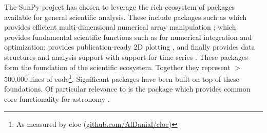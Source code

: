 The SunPy project has chosen  to leverage the rich ecosystem of packages available for general scientific analysis. These include packages such as
 which provides efficient multi-dimensional numerical array manipulation \citep{numpy} ;  which provides fundamental scientific functions such as for numerical integration and optimization\citep{scipy};  provides publication-ready 2D plotting \citep{matplotlib}, and finally  provides data structures and analysis support with support for time series \citep{pandas}. These packages form the foundation of the scientific \python ecosystem. Together they represent $>$500,000 lines of code\footnote{As measured by cloc (\url{github.com/AlDanial/cloc})}. Significant packages have been built on top of these foundations. Of particular relevance to \sunpypkg is the  package which provides common core functionality for astronomy \citep{astropy2018}. 





